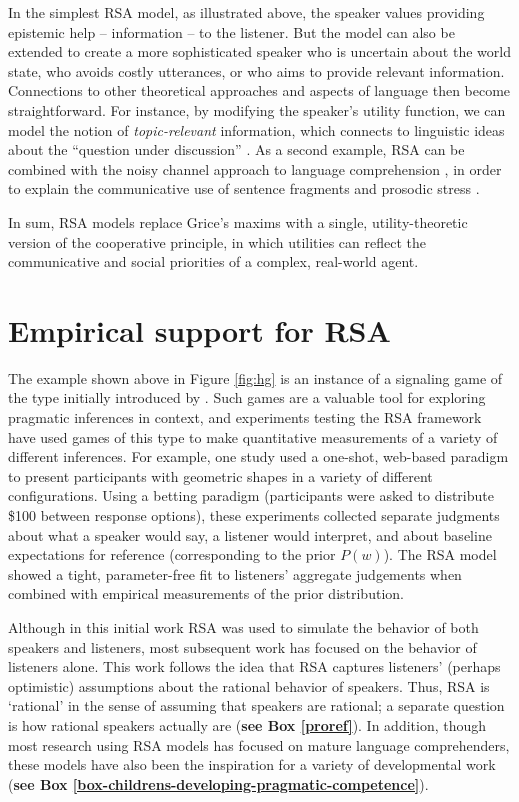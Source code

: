 \documentclass[]{elsarticle}
\begin{document}
In the simplest RSA model, as illustrated above, the speaker values
providing epistemic help -- information -- to the listener. But the model can also be extended to create a more sophisticated speaker who is uncertain
about the world state, who avoids costly utterances, or who aims to
provide relevant information. Connections to
other theoretical approaches and aspects of language then become
straightforward. For instance, by modifying the speaker's utility function, we can model the notion of \emph{topic-relevant} information, which
connects to linguistic ideas about the ``question under discussion''
\citep{roberts1996}.
As a second example, RSA can be combined with the noisy
channel approach to language comprehension \citep{levy2008},
in order to explain the communicative use of sentence fragments and prosodic stress \citep{bergen2016}.

In sum, RSA models replace Grice's maxims with a single, utility-theoretic
version of the cooperative principle, in which utilities can reflect the communicative and social priorities of a complex, real-world agent.

\section{Empirical support for RSA}\label{empirical-support-for-rsa}

The example shown above in Figure \ref{fig:hg} is an instance of a signaling game of the type  initially introduced by \citet{lewis1969}. Such games are a valuable tool for exploring pragmatic inferences in context, and experiments testing the
RSA framework have used games of this type to make quantitative
measurements of a variety of different inferences. For example, one study \citep{frank2012} used a one-shot, web-based paradigm to present
participants with geometric shapes in a variety of different
configurations. Using a betting paradigm (participants were asked to
distribute \$100 between response options), these experiments collected
separate judgments about what a speaker would say, a listener would
interpret, and about baseline expectations for reference (corresponding
to the prior $P(w)$). The RSA model showed a tight, parameter-free fit
to listeners' aggregate judgements when combined
with empirical measurements of the prior distribution.

Although in this initial work RSA was used to simulate the behavior of
both speakers and listeners, most subsequent work has focused on the
behavior of listeners alone. This work follows the idea that RSA captures listeners'
(perhaps optimistic) assumptions about the rational behavior of
speakers. Thus, RSA is `rational' in the sense of assuming that
speakers are rational; a separate question is how rational speakers
actually are (\textbf{see Box \ref{proref}}).
In addition, though most research using RSA models has focused on mature language comprehenders, these models have also been the inspiration for a variety of developmental work (\textbf{see Box \ref{box-childrens-developing-pragmatic-competence}}).
\end{document}
